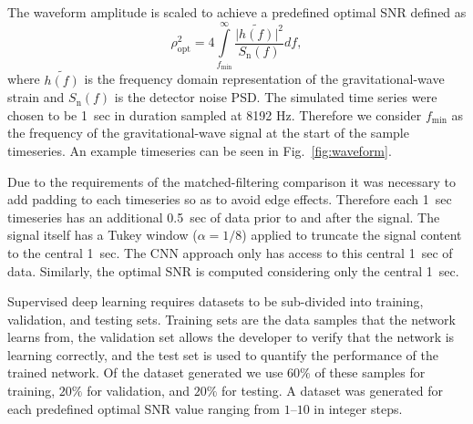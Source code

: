 \documentclass[%
showpacs,
 amsmath,amssymb,
 aps,
 twocolumn,
 prl,
 reprint,
floatfix,
]{revtex4-1}
\newcommand{\fergus}[1]{\textbf{\textcolor{cyan}{FERGUS: #1}}}
\begin{document}

%
%
The waveform amplitude is scaled to achieve a predefined optimal \ac{SNR}
defined as
%
%
\begin{equation}\label{eq:snr} 
\rho_{\mathrm{opt}}^{2} = 4
\int\limits_{f_{\mathrm{min}}}^{\infty} \frac{\lvert
\tilde{h(f)}\rvert^{2}}{S_{\mathrm{n}}(f)} df,
\end{equation}
%
where $\tilde{h(f)}$ is the frequency domain representation of the
gravitational-wave strain and $S_{\mathrm{n}}(f)$ is the detector noise
\ac{PSD}. The simulated time series were chosen to be 1~sec in duration sampled
at 8192 Hz. Therefore we consider $f_{\mathrm{min}}$ as the frequency of the
gravitational-wave signal at the start of the sample timeseries. An example
timeseries can be seen in Fig.~\ref{fig:waveform}. 

%
%
Due to the requirements of the matched-filtering comparison it was necessary to
add padding to each timeseries so as to avoid edge effects. Therefore
each 1~sec timeseries has an additional 0.5~sec of data prior to and after the signal.
The signal itself has a Tukey window ($\alpha=1/8$) applied to truncate the
signal content to the central 1~sec. The \ac{CNN} approach only has access to
this central 1~sec of data. Similarly, the optimal \ac{SNR} is computed considering
only the central 1~sec.

%
%
Supervised deep learning requires datasets to be sub-divided into training,
validation, and testing sets. Training sets are the data samples that the
network learns from, the validation set allows the developer to verify that the
network is learning correctly, and the test set is used to quantify the
performance of the trained network.  Of the dataset generated we use $60\%$ of
these samples for training, $20\%$ for validation, and $20\%$ for testing. A
dataset was generated for each predefined optimal \ac{SNR} value ranging
from $1$--$10$ in integer steps. 
\end{document}
